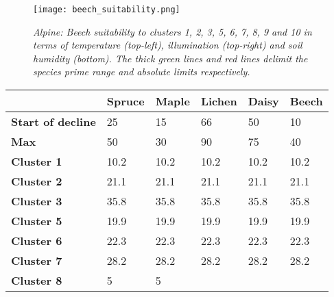 \begin{figure}
\center
	\texttt{[image: beech\_suitability.png]}
	\caption{ \textit{Alpine: Beech suitability to clusters 1, 2, 3, 5, 6, 7, 8, 9 and 10 in terms of temperature (top-left), illumination (top-right) and soil humidity (bottom). The thick green lines and red lines delimit the species prime range and absolute limits respectively.}}
	\label{fig:results_alpine_beech_suitability}
\end{figure}

\begin{table}[h]
  \centering
	    \begin{tabular}{|p{2cm}|p{2.5cm}|p{2.5cm}|p{2.5cm}|p{2.5cm}|p{2.5cm}|}
		\hline	
  	     & \textbf{Spruce} & \textbf{Maple} & \textbf{Lichen} & \textbf{Daisy} & \textbf{Beech}\\
  	    \hline	
		\textbf{Start of decline} & 
		25 & 
		15 & 
		66 & 
		50 & 
		10 \\
		\hline
		\textbf{Max} & 
		50 & 
		30 & 
		90 & 
		75 & 
		40 \\
		\hline
		\textbf{Cluster 1} & 
		\cellcolor{color_green}10.2 &
		\cellcolor{color_green}10.2 &
		\cellcolor{color_green}10.2 &
		\cellcolor{color_green}10.2 &
		\cellcolor{color_orange}10.2 \\
		\hline
		\textbf{Cluster 2} & 
		\cellcolor{color_orange}21.1 &
		\cellcolor{color_orange}21.1 &
		\cellcolor{color_green}21.1 &
		\cellcolor{color_green}21.1 &
		\cellcolor{color_orange}21.1 \\
		\hline
		\textbf{Cluster 3} & 
		\cellcolor{color_orange}35.8 & 
		\cellcolor{color_red}35.8 & 
		\cellcolor{color_green}35.8 & 
		\cellcolor{color_green}35.8 & 
		\cellcolor{color_orange}35.8\\
		\hline
		\textbf{Cluster 5} & 
		\cellcolor{color_green}19.9 & 
		\cellcolor{color_orange}19.9 & 
		\cellcolor{color_green}19.9 & 
		\cellcolor{color_green}19.9 & 
		\cellcolor{color_orange}19.9\\
		\hline
		\textbf{Cluster 6} & 
		\cellcolor{color_green}22.3 & 
		\cellcolor{color_orange}22.3 & 
		\cellcolor{color_green}22.3 & 
		\cellcolor{color_green}22.3 & 
		\cellcolor{color_orange}22.3\\
		\hline
		\textbf{Cluster 7} & 
		\cellcolor{color_orange}28.2 & 
		\cellcolor{color_orange}28.2 & 
		\cellcolor{color_green}28.2 & 
		\cellcolor{color_green}28.2 & 
		\cellcolor{color_orange}28.2\\
		\hline
		\textbf{Cluster 8} & 
		\cellcolor{color_green}5 & 
		\cellcolor{color_green}5 & 

\end{tabular}
\end{table}
